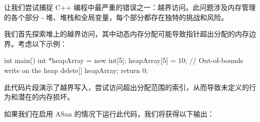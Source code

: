 
让我们尝试捕捉 C++ 编程中最严重的错误之一：越界访问。此问题涉及内存管理的各个部分 - 堆、堆栈和全局变量，每个部分都存在独特的挑战和风险。


我们首先探索堆上的越界访问，其中动态内存分配可能导致指针超出分配的内存边界。考虑以下示例：

\begin{cpp}
int main() {
    int *heapArray = new int[5];
    heapArray[5] = 10; // Out-of-bounds write on the heap
    delete[] heapArray;
    return 0;
}
\end{cpp}

此代码片段演示了越界写入，尝试访问超出分配范围的索引，从而导致未定义的行为和潜在的内存损坏。

如果我们在启用 ASan 的情况下运行此代码，我们将获得以下输出：

